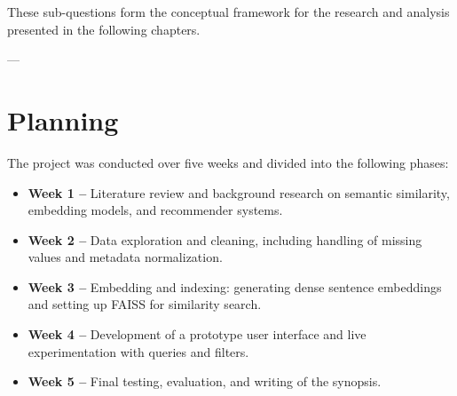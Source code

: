 These sub-questions form the conceptual framework for the research and analysis presented in the following chapters.

---

\section{Planning}
\label{sec:planning}

The project was conducted over five weeks and divided into the following phases:

\begin{itemize}
    \item \textbf{Week 1 –} Literature review and background research on semantic similarity, embedding models, and recommender systems.
    \item \textbf{Week 2 –} Data exploration and cleaning, including handling of missing values and metadata normalization.
    \item \textbf{Week 3 –} Embedding and indexing: generating dense sentence embeddings and setting up FAISS for similarity search.
    \item \textbf{Week 4 –} Development of a prototype user interface and live experimentation with queries and filters.
    \item \textbf{Week 5 –} Final testing, evaluation, and writing of the synopsis.
\end{itemize}

